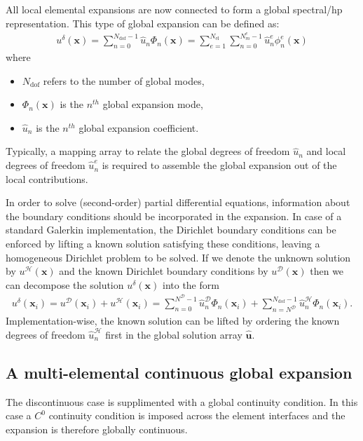 All local elemental expansions are now connected to form a global spectral/hp
representation. This type of global expansion can be defined as:
\begin{align*}
u^{\delta}(\boldsymbol{x})=\sum_{n=0}^{N_{\mathrm{dof}}-1}\hat{u}_n
  \Phi_n(\boldsymbol{x})=\sum_{e=1}^{{N_{\mathrm{el}}}}
  \sum_{n=0}^{N^{e}_m-1}\hat{u}_n^e\phi_n^e(\boldsymbol{x})
\end{align*}
where
\begin{itemize}
\item $N_{\mathrm{dof}}$ refers to the number of global modes, 
\item $\Phi_n(\boldsymbol{x})$ is the $n^{th}$ global
expansion mode, 
\item $\hat{u}_n$ is the $n^{th}$ global expansion coefficient.
\end{itemize}

Typically, a mapping array to relate the global degrees of freedom
$\hat{u}_n$ and local degrees of freedom $\hat{u}_n^e$ is
required to assemble the global expansion out of the local contributions.

In order to solve (second-order) partial differential equations, information
 about the boundary conditions should be incorporated in the expansion. In case
 of a standard Galerkin implementation, the Dirichlet boundary conditions can be
 enforced by lifting a known solution satisfying these conditions, leaving a
 homogeneous Dirichlet problem to be solved. If we denote the unknown solution
 by $u^{\mathcal{H}}(\boldsymbol{x})$ and the known Dirichlet
 boundary conditions by $u^{\mathcal{D}}(\boldsymbol{x})$ then we can
 decompose the solution $u^{\delta}(\boldsymbol{x})$ into the form
\begin{align*}
  u^{\delta}(\boldsymbol{x}_i)=u^{\mathcal{D}}(\boldsymbol{x}_i)+
  u^{\mathcal{H}}(\boldsymbol{x}_i)=\sum_{n=0}^{N^{\mathcal{D}}-1}
  \hat{u}_n^{\mathcal{D}}\Phi_n(\boldsymbol{x}_i)+
  \sum_{n={N^{\mathcal{D}}}}^{N_{\mathrm{dof}}-1}
  \hat{u}_n^{\mathcal{H}}\Phi_n(\boldsymbol{x}_i).
\end{align*}
Implementation-wise, the known solution can be lifted by ordering the known
degrees of freedom $\hat{u}_n^{\mathcal{H}}$ first in the global
solution array $\boldsymbol{\hat{u}}$.


\subsection{A multi-elemental continuous global expansion}
The discontinuous case is supplimented with a global continuity condition. In
this case a $C^0$ continuity condition is imposed across the element
interfaces and the expansion is therefore globally continuous.

